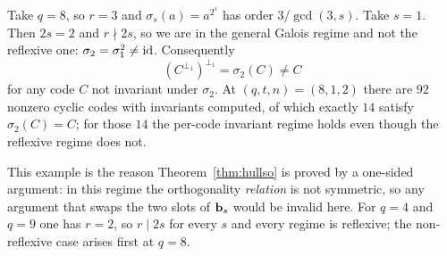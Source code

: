 \begin{example}
\label{ex:nonreflexive}
Take $q=8$, so $r=3$ and $\sigma_s(a)=a^{2^s}$ has order
$3/\gcd(3,s)$. Take $s=1$. Then $2s=2$ and $r\nmid 2s$, so we are in the
general Galois regime and not the reflexive one:
$\sigma_2=\sigma_1^2\ne\mathrm{id}$. Consequently
\[
  (C^{\perp_1})^{\perp_1}=\sigma_2(C)\ne C
\]
for any code $C$ not invariant under $\sigma_2$. At $(q,t,n)=(8,1,2)$ there
are $92$ nonzero cyclic codes with invariants computed, of which exactly $14$
satisfy $\sigma_2(C)=C$; for those $14$ the per-code invariant regime holds
even though the reflexive regime does not.

This example is the reason Theorem~\ref{thm:hullso} is proved by a
one-sided argument: in this regime the orthogonality \emph{relation} is not
symmetric, so any argument that swaps the two slots of $\mathbf b_s$ would be
invalid here. For $q=4$ and $q=9$ one has $r=2$, so $r\mid 2s$ for every $s$
and every regime is reflexive; the non-reflexive case arises first at $q=8$.
\end{example}
